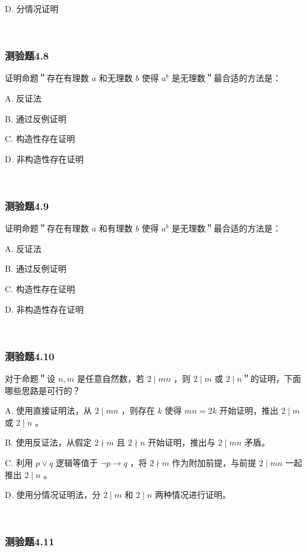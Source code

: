 \documentclass[UTF8, heading=true]{ctexart}
\begin{document}
D. 分情况证明

\textcolor{white}{答案：C}

\subsubsection{测验题4.8}

证明命题＂存在有理数 $a$ 和无理数 $b$ 使得 $a^b$ 是无理数＂最合适的方法是：

A. 
反证法

B. 
通过反例证明

C. 
构造性存在证明

D.  
非构造性存在证明

\textcolor{white}{答案：D}

\subsubsection{测验题4.9}

证明命题＂存在有理数 $a$ 和有理数 $b$ 使得 $a^b$ 是无理数＂最合适的方法是：

A. 反证法

B. 通过反例证明

C. 构造性存在证明

D.  非构造性存在证明

\textcolor{white}{答案：C}

\subsubsection{测验题4.10}

对于命题＂设 $n, m$ 是任意自然数，若 $2 \mid m n$ ，则 $2 \mid m$ 或 $2 \mid n$＂的证明，下面哪些思路是可行的？

A. 使用直接证明法，从 $2 \mid m n$ ，则存在 $k$ 使得 $m n=2 k$ 开始证明，推出 $2 \mid m$ 或 $2 \mid n$ 。

B. 使用反证法，从假定 $2 \nmid m$ 且 $2 \nmid n$ 开始证明，推出与 $2 \mid m n$ 矛盾。

C. 利用 $p \vee q$ 逻辑等值于 $\neg p \rightarrow q$ ，将 $2 \nmid m$ 作为附加前提，与前提 $2 \mid m n$ 一起推出 $2 \mid n$ 。

D.  使用分情况证明法，分 $2 \mid m$ 和 $2 \mid n$ 两种情况进行证明。

\textcolor{white}{答案：BC}

\subsubsection{测验题4.11}
\end{document}
